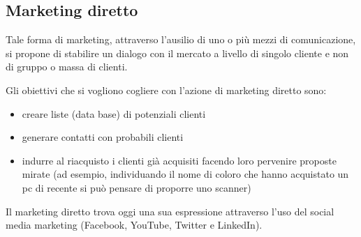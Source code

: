 \subsection{Marketing diretto}
Tale forma di marketing, attraverso l’ausilio di uno o più mezzi di comunicazione, si propone di stabilire un dialogo con il mercato a livello di singolo cliente e non di gruppo o massa di clienti.

Gli obiettivi che si vogliono cogliere con l’azione di marketing diretto sono:
\begin{itemize}
	\item creare liste (data base) di potenziali clienti
	\item generare contatti con probabili clienti
	\item indurre al riacquisto i clienti già acquisiti facendo loro pervenire proposte mirate (ad esempio, individuando il nome di coloro che hanno acquistato un pc di recente si può pensare di proporre uno scanner)
\end{itemize}
Il marketing diretto trova oggi una sua espressione attraverso l’uso del social media marketing (Facebook, YouTube, Twitter e LinkedIn).
